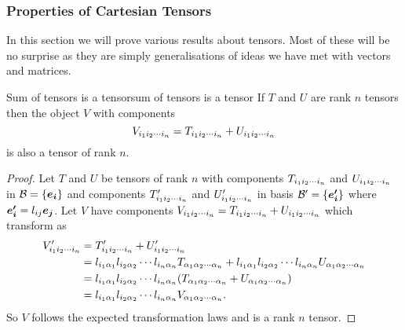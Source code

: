 \subsubsection{Properties of Cartesian Tensors}
In this section we will prove various results about tensors.
Most of these will be no surprise as they are simply generalisations of ideas we have met with vectors and matrices.
\begin{lemma}{Sum of tensors is a tensor}{sum of tensors is a tensor}
    If \(T\) and \(U\) are rank \(n\) tensors then the object \(V\) with components
    \[V_{{ {i}_1 {i}_2 \dotsm {i}_{n} }} = T_{{ {i}_1 {i}_2 \dotsm {i}_{n} }} + U_{{ {i}_1 {i}_2 \dotsm {i}_{n} }}\]
    is also a tensor of rank \(n\).
\end{lemma}
\begin{proof}
    Let \(T\) and \(U\) be tensors of rank \(n\) with components \(T_{ {i}_1 {i}_2 \dotsm {i}_{n} }\) and \(U_{ {i}_1 {i}_2 \dotsm {i}_{n} }\) in \(\mathcal{B} = \{\bm{e_{i}}\}\) and components \(T'_{ {i}_1 {i}_2 \dotsm {i}_{n} }\) and \(U'_{ {i}_1 {i}_2 \dotsm {i}_{n} }\) in basis \(\mathcal{B}' = \{\bm{e'_{i}}\}\) where \(\bm{e'_{i}} = l_{ij}\bm{e_{j}}\).
    Let \(V\) have components \(V_{ {i}_1 {i}_2 \dotsm {i}_{n} } = T_{ {i}_1 {i}_2 \dotsm {i}_{n} } + U_{ {i}_1 {i}_2 \dotsm {i}_{n} }\) which transform as
    \begin{align*}
        V'_{{ {i}_1 {i}_2 \dotsm {i}_{n} }} &= T'_{ {i}_1 {i}_2 \dotsm {i}_{n} } + U'_{ {i}_1 {i}_2 \dotsm {i}_{n} }\\
        &= l_{i_1\alpha_1}l_{i_2\alpha_2} \dotsm l_{i_n\alpha_n} T_{ {\alpha}_1 {\alpha}_2 \dotsm {\alpha}_{n} } + l_{i_1\alpha_1}l_{i_2\alpha_2} \dotsm l_{i_n\alpha_n} U_{ {\alpha}_1 {\alpha}_2 \dotsm {\alpha}_{n} }\\
        &= l_{i_1\alpha_1}l_{i_2\alpha_2} \dotsm l_{i_n\alpha_n} (T_{ {\alpha}_1 {\alpha}_2 \dotsm {\alpha}_{n} } + U_{ {\alpha}_1 {\alpha}_2 \dotsm {\alpha}_{n} })\\
        &=l_{i_1\alpha_1}l_{i_2\alpha_2} \dotsm l_{i_n\alpha_n} V_{ {\alpha}_1 {\alpha}_2 \dotsm {\alpha}_{n} }.
    \end{align*}
    So \(V\) follows the expected transformation laws and is a rank \(n\) tensor.
\end{proof}

